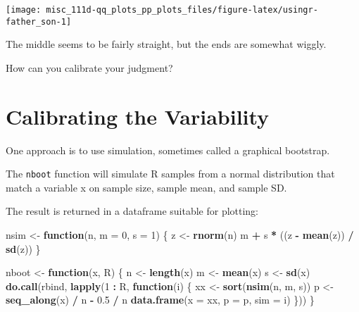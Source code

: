 \documentclass[]{book}
\newenvironment{Shaded}{\begin{snugshade}}{\end{snugshade}}
\newcommand{\ControlFlowTok}[1]{\textcolor[rgb]{0.13,0.29,0.53}{\textbf{#1}}}
\newcommand{\DataTypeTok}[1]{\textcolor[rgb]{0.13,0.29,0.53}{#1}}
\newcommand{\DecValTok}[1]{\textcolor[rgb]{0.00,0.00,0.81}{#1}}
\newcommand{\FloatTok}[1]{\textcolor[rgb]{0.00,0.00,0.81}{#1}}
\newcommand{\KeywordTok}[1]{\textcolor[rgb]{0.13,0.29,0.53}{\textbf{#1}}}
\newcommand{\NormalTok}[1]{#1}
\newcommand{\OperatorTok}[1]{\textcolor[rgb]{0.81,0.36,0.00}{\textbf{#1}}}
\newcommand{\StringTok}[1]{\textcolor[rgb]{0.31,0.60,0.02}{#1}}
\begin{document}
\begin{center}\texttt{[image: misc\_111d-qq\_plots\_pp\_plots\_files/figure-latex/usingr-father\_son-1]} \end{center}

The middle seems to be fairly straight, but the ends are somewhat wiggly.

How can you calibrate your judgment?

\hypertarget{calibrating-the-variability}{%
\section{Calibrating the Variability}\label{calibrating-the-variability}}

One approach is to use simulation, sometimes called a graphical bootstrap.

The \texttt{nboot} function will simulate R samples from a normal distribution that match a variable x on sample size, sample mean, and sample SD.

The result is returned in a dataframe suitable for plotting:

\begin{Shaded}
\begin{Highlighting}[]
\NormalTok{nsim <-}\StringTok{ }\ControlFlowTok{function}\NormalTok{(n, }\DataTypeTok{m =} \DecValTok{0}\NormalTok{, }\DataTypeTok{s =} \DecValTok{1}\NormalTok{) \{}
\NormalTok{    z <-}\StringTok{ }\KeywordTok{rnorm}\NormalTok{(n)}
\NormalTok{    m }\OperatorTok{+}\StringTok{ }\NormalTok{s }\OperatorTok{*}\StringTok{ }\NormalTok{((z }\OperatorTok{-}\StringTok{ }\KeywordTok{mean}\NormalTok{(z)) }\OperatorTok{/}\StringTok{ }\KeywordTok{sd}\NormalTok{(z))}
\NormalTok{\}}

\NormalTok{nboot <-}\StringTok{ }\ControlFlowTok{function}\NormalTok{(x, R) \{}
\NormalTok{    n <-}\StringTok{ }\KeywordTok{length}\NormalTok{(x)}
\NormalTok{    m <-}\StringTok{ }\KeywordTok{mean}\NormalTok{(x)}
\NormalTok{    s <-}\StringTok{ }\KeywordTok{sd}\NormalTok{(x)}
    \KeywordTok{do.call}\NormalTok{(rbind,}
            \KeywordTok{lapply}\NormalTok{(}\DecValTok{1} \OperatorTok{:}\StringTok{ }\NormalTok{R,}
                   \ControlFlowTok{function}\NormalTok{(i) \{}
\NormalTok{                       xx <-}\StringTok{ }\KeywordTok{sort}\NormalTok{(}\KeywordTok{nsim}\NormalTok{(n, m, s))}
\NormalTok{                       p <-}\StringTok{ }\KeywordTok{seq_along}\NormalTok{(x) }\OperatorTok{/}\StringTok{ }\NormalTok{n }\OperatorTok{-}\StringTok{ }\FloatTok{0.5} \OperatorTok{/}\StringTok{ }\NormalTok{n}
                       \KeywordTok{data.frame}\NormalTok{(}\DataTypeTok{x =}\NormalTok{ xx, }\DataTypeTok{p =}\NormalTok{ p, }\DataTypeTok{sim =}\NormalTok{ i)}
\NormalTok{    \}))}
\NormalTok{\}}
\end{Highlighting}
\end{Shaded}
\end{document}
